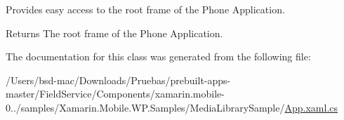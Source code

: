 Provides easy access to the root frame of the Phone Application. 

\begin{DoxyReturn}{Returns}
The root frame of the Phone Application.
\end{DoxyReturn}


The documentation for this class was generated from the following file\+:\begin{DoxyCompactItemize}
\item 
/\+Users/bsd-\/mac/\+Downloads/\+Pruebas/prebuilt-\/apps-\/master/\+Field\+Service/\+Components/xamarin.\+mobile-\/0../samples/\+Xamarin.\+Mobile.\+W\+P.\+Samples/\+Media\+Library\+Sample/\hyperlink{_components_2xamarin_8mobile-0_86_81_2samples_2_xamarin_8_mobile_8_w_p_8_samples_2_media_library_sample_2_app_8xaml_8cs}{App.\+xaml.\+cs}\end{DoxyCompactItemize}
